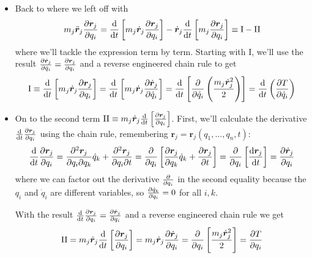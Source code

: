 \documentclass[11pt, a4paper]{article}
\newcommand{\bdot}[1]{\dot{\bm{#1}}}
\newcommand{\bddot}[1]{\ddot{\bm{#1}}}
\begin{document}
\begin{itemize}
	\item Back to where we left off with
	\begin{equation*}
		m_{j}\bddot{\bm{r}}_{j} \pdv{\bm{r}_{j}}{q_{i}} = \dv{}{t}\left[m_{j}\bdot{r}_{j}  \pdv{\bm{r}_{j}}{q_{i}} \right] - \bdot{r}_{j} \dv{}{t}\left[m_{j}\pdv{\bm{r}_{j}}{q_{i}} \right] \equiv \mathrm{I} - \mathrm{II}
	\end{equation*}
	where we'll tackle the expression term by term. Starting with I, we'll use the result $ \pdv{\bdot{r}_{j}}{\dot{q}_{i}} = \pdv{\bm{r}_{j}}{q_{i}} $ and a reverse engineered chain rule to get
	\begin{equation*}
		\mathrm{I} \equiv \dv{}{t}\left[m_{j} \bdot{r}_{j}  \pdv{\bm{r}_{j}}{q_{i}} \right] =  \dv{}{t}\left[m_{j} \bdot{r}_{j}  \pdv{\bdot{r}_{j}}{\dot{q}_{i}} \right] = \dv{}{t} \left[\pdv{}{\dot{q}_{i}}  \left(\frac{m_{j} \bdot{r}_{j}^{2}}{2}\right)\right] = \dv{}{t} \left(\pdv{T}{\dot{q}_{i}}\right)
	\end{equation*}

	
	\item On to the second term $ \mathrm{II} \equiv m_{j} \bdot{r}_{j} \dv{}{t}\left[\pdv{\bm{r}_{j}}{q_{i}} \right] $. First, we'll calculate the derivative $ \dv{}{t} \pdv{\bm{r}_{j}}{q_{i}} $ using the chain rule, remembering $ \bm{r}_{j} = \bm{r}_{j}(q_{1}, \ldots, q_{n}, t) $:
	\begin{equation*}
		\dv{}{t} \pdv{\bm{r}_{j}}{q_{i}} = \pdv{\bm{r}_{j}}{q_{i}}{q_{k}} \dot{q}_{k} + \pdv{\bm{r}_{j}}{q_{i}}{t} = \pdv{}{q_{i}} \left[\pdv{\bm{r}_{j}}{q_{k}} \dot{q}_{k} + \pdv{\bm{r}_{j}}{t}\right] = \pdv{}{q_{i}}\left[\dv{\bm{r}_{j}}{t}\right] = \pdv{\bdot{r}_{j}}{q_{i}}
	\end{equation*}
	where we can factor out the derivative $ \pdv{}{q_{i}} $ in the second equality because the $ q_{i} $ and $ \dot{q}_{i} $ are different variables, so $ \pdv{\dot{q}_{k}}{q_{i}} = 0$ for all $ i, k $.
	
	With the result $ \dv{}{t} \pdv{\bm{r}_{j}}{q_{i}} = \pdv{\bdot{r}_{j}}{q_{i}} $ and a reverse engineered chain rule we get
	\begin{equation*}
		\mathrm{II} =  m_{j} \bdot{r}_{j} \dv{}{t}\left[\pdv{\bm{r}_{j}}{q_{i}} \right]  = m_{j} \bdot{r}_{j} \pdv{\bdot{r}_{j}}{q_{i}} = \pdv{}{q_{i}} \left[\frac{m_{j} \bdot{r}_{j}^{2}}{2} \right] = \pdv{T}{q_{i}}
	\end{equation*}
	

\end{itemize}
\end{document}
